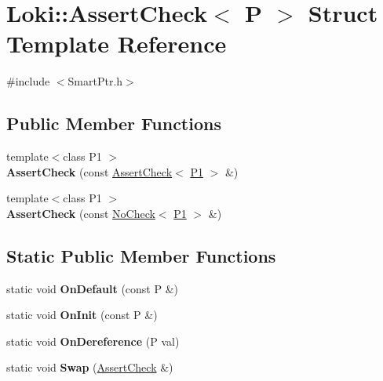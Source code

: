 \hypertarget{structLoki_1_1AssertCheck}{}\section{Loki\+:\+:Assert\+Check$<$ P $>$ Struct Template Reference}
\label{structLoki_1_1AssertCheck}


{\ttfamily \#include $<$Smart\+Ptr.\+h$>$}

\subsection*{Public Member Functions}
\begin{DoxyCompactItemize}
\item 
\hypertarget{structLoki_1_1AssertCheck_a908c892b591913f427210d3457febfb5}{}{\footnotesize template$<$class P1 $>$ }\\{\bfseries Assert\+Check} (const \hyperlink{structLoki_1_1AssertCheck}{Assert\+Check}$<$ \hyperlink{structP1}{P1} $>$ \&)\label{structLoki_1_1AssertCheck_a908c892b591913f427210d3457febfb5}

\item 
\hypertarget{structLoki_1_1AssertCheck_aa8b943b08ce5f7a67b70cb197c83421f}{}{\footnotesize template$<$class P1 $>$ }\\{\bfseries Assert\+Check} (const \hyperlink{structLoki_1_1NoCheck}{No\+Check}$<$ \hyperlink{structP1}{P1} $>$ \&)\label{structLoki_1_1AssertCheck_aa8b943b08ce5f7a67b70cb197c83421f}

\end{DoxyCompactItemize}
\subsection*{Static Public Member Functions}
\begin{DoxyCompactItemize}
\item 
\hypertarget{structLoki_1_1AssertCheck_ae0d55c480d61237b09066be5d83782c4}{}static void {\bfseries On\+Default} (const P \&)\label{structLoki_1_1AssertCheck_ae0d55c480d61237b09066be5d83782c4}

\item 
\hypertarget{structLoki_1_1AssertCheck_a3c56ed389dd775bda8731ea76297e1e3}{}static void {\bfseries On\+Init} (const P \&)\label{structLoki_1_1AssertCheck_a3c56ed389dd775bda8731ea76297e1e3}

\item 
\hypertarget{structLoki_1_1AssertCheck_aa089c5d22b51ce69eab035104037cfa8}{}static void {\bfseries On\+Dereference} (P val)\label{structLoki_1_1AssertCheck_aa089c5d22b51ce69eab035104037cfa8}

\item 
\hypertarget{structLoki_1_1AssertCheck_af02dca72335ea547e209d31a0366f22e}{}static void {\bfseries Swap} (\hyperlink{structLoki_1_1AssertCheck}{Assert\+Check} \&)\label{structLoki_1_1AssertCheck_af02dca72335ea547e209d31a0366f22e}

\end{DoxyCompactItemize}



